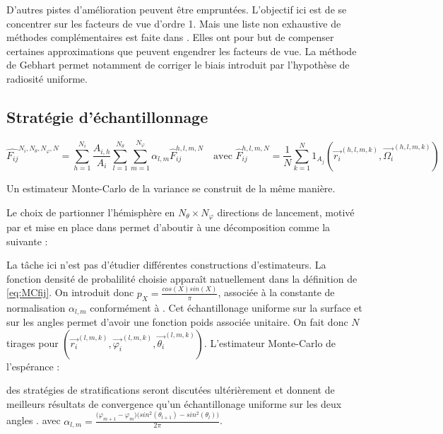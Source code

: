 D'autres pistes d'amélioration peuvent être empruntées. L'objectif ici est de se concentrer sur les facteurs de vue d'ordre 1. Mais une liste non exhaustive de méthodes complémentaires est faite dans \cite{Romain25}. Elles ont pour but de compenser certaines approximations que peuvent engendrer les facteurs de vue. La méthode de Gebhart \cite{gebhart} permet notamment de corriger le biais introduit par l'hypothèse de radiosité uniforme. 



\subsection{Stratégie d'échantillonnage}
\label{part:echanti}
\begin{equation}
    \hat{F_{ij}}^{N_i, N_\theta, N_\varphi, N} =  \sum_{h = 1}^{N_i} \frac{A_{i,h}}{A_i} \sum_{l = 1}^{N_{\theta}} \sum_{m = 1}^{N_{\varphi}} \alpha_{l,m} \hat{F}_{ij}^{h,l,m, N} \quad \text{avec } \hat{F}_{ij}^{h,l,m, N} = \frac{1}{N} \sum_{k = 1}^{N} 1_{A_j}(\vec{r_i}^{(h,l,m,k)}, \vec{\Omega_i}^{(h,l,m,k)}) 
    \label{eq:fv1}
\end{equation}

Un estimateur Monte-Carlo de la variance se construit de la même manière.


Le choix de partionner l'hémisphère en $N_\theta \times N_\varphi$ directions de lancement, motivé par \cite{partition} et mise en place dans \cite{Romain25} permet d'aboutir à une décomposition comme la suivante :


La tâche ici n'est pas d'étudier différentes constructions d'estimateurs. La fonction densité de probalilité choisie apparaît natuellement dans la définition de \ref{eq:MCfij}. On introduit donc $p_X = \frac{cos(X)sin(X)}{\pi}$, associée à la constante de normalisation $ \alpha_{l,m} $ conformément à \cite{Romain25}. Cet échantillonage uniforme sur la surface et sur les angles permet d'avoir une fonction poids associée unitaire. On fait donc $N$ tirages pour $(\vec{r_i}^{(l,m,k)}, \vec{\varphi_i}^{(l,m,k)}, \vec{\theta_i}^{(l,m,k)})$. L'estimateur Monte-Carlo de l'espérance :


des stratégies de stratifications seront discutées ultérièrement et donnent de meilleurs résultats de convergence qu'un échantillonage uniforme sur les deux angles \cite{Romain25}.
avec    $\alpha_{l,m}= \frac{\big(\varphi_{m+1}- \varphi_{m} \big)\big(sin^2(\theta_{l+1})-sin^2(\theta_{l})\big)}{2\pi}$.

